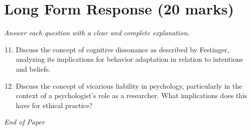 \documentclass[12pt]{article}
\begin{document}
\section*{Long Form Response (20 marks)}
\textit{Answer each question with a clear and complete explanation.}
\begin{enumerate}[label=\arabic*.]
\setcounter{enumi}{10}
\item Discuss the concept of cognitive dissonance as described by Festinger, analyzing its implications for behavior adaptation in relation to intentions and beliefs.
\item Discuss the concept of vicarious liability in psychology, particularly in the context of a psychologist's role as a researcher. What implications does this have for ethical practice?
\end{enumerate}

\vfill
\noindent\textit{End of Paper}
\end{document}
